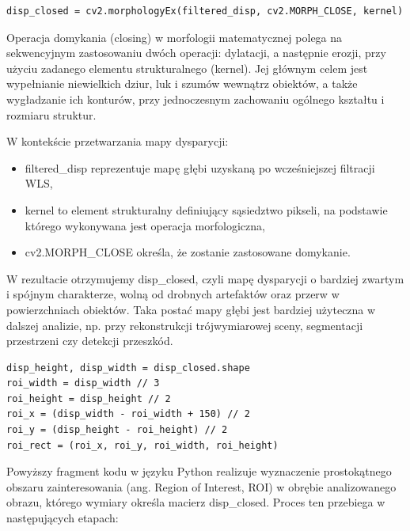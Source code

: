 \documentclass[magisterska]{pracadypl}
\begin{document}
\begin{lstlisting}[style=mypython]
disp_closed = cv2.morphologyEx(filtered_disp, cv2.MORPH_CLOSE, kernel)
\end{lstlisting}

Operacja domykania (closing) w morfologii matematycznej polega na sekwencyjnym zastosowaniu dwóch operacji: dylatacji, a następnie erozji, przy użyciu zadanego elementu strukturalnego (kernel). Jej głównym celem jest wypełnianie niewielkich dziur, luk i szumów wewnątrz obiektów, a także wygładzanie ich konturów, przy jednoczesnym zachowaniu ogólnego kształtu i rozmiaru struktur.

W kontekście przetwarzania mapy dysparycji:

\begin{itemize}
  \item filtered\_disp reprezentuje mapę głębi uzyskaną po wcześniejszej filtracji WLS,
  \item kernel to element strukturalny definiujący sąsiedztwo pikseli, na podstawie którego wykonywana jest operacja morfologiczna,
  \item cv2.MORPH\_CLOSE określa, że zostanie zastosowane domykanie.
\end{itemize}

W rezultacie otrzymujemy disp\_closed, czyli mapę dysparycji o bardziej zwartym i spójnym charakterze, wolną od drobnych artefaktów oraz przerw w powierzchniach obiektów. Taka postać mapy głębi jest bardziej użyteczna w dalszej analizie, np. przy rekonstrukcji trójwymiarowej sceny, segmentacji przestrzeni czy detekcji przeszkód.

\begin{lstlisting}[style=mypython]
disp_height, disp_width = disp_closed.shape
roi_width = disp_width // 3  
roi_height = disp_height // 2  
roi_x = (disp_width - roi_width + 150) // 2
roi_y = (disp_height - roi_height) // 2
roi_rect = (roi_x, roi_y, roi_width, roi_height)
\end{lstlisting}

Powyższy fragment kodu w języku Python realizuje wyznaczenie prostokątnego obszaru zainteresowania (ang. Region of Interest, ROI) w obrębie analizowanego obrazu, którego wymiary określa macierz disp\_closed. Proces ten przebiega w następujących etapach:
\end{document}
